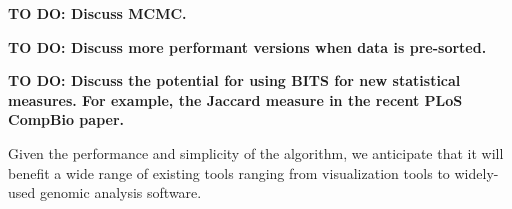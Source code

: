 \documentclass{bioinfo}
\begin{document}
	\textbf{TO DO: Discuss MCMC.}
	
	\textbf{TO DO: Discuss more performant versions when data is pre-sorted.}

	\textbf{TO DO: Discuss the potential for using BITS for new statistical measures.  For
	example, the Jaccard measure in the recent PLoS CompBio paper.}
	
	Given the performance and simplicity of the algorithm, we
	anticipate that it will benefit a wide range of existing tools ranging from
	visualization tools to widely-used genomic analysis software.

	
	
\end{document}
